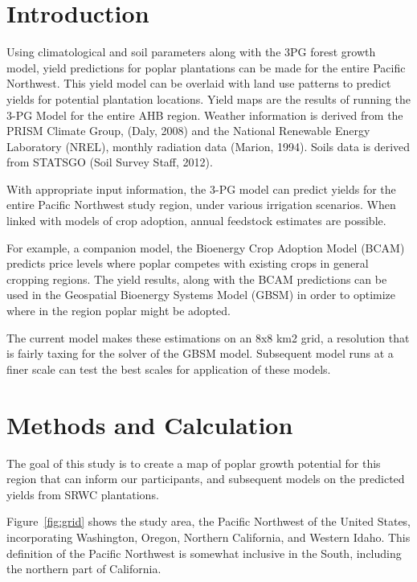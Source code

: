 \documentclass[preprint,12pt]{elsarticle}
\begin{document}

\section{Introduction}
\label{sec:introduction}

Using climatological and soil parameters along with the 3PG forest
growth model, yield predictions for poplar plantations can be made for
the entire Pacific Northwest.  This yield model can be overlaid with
land use patterns to predict yields for potential plantation
locations.  Yield maps are the results of running the 3-PG Model for
the entire AHB region. Weather information is derived from the PRISM
Climate Group, (Daly, 2008) and the National Renewable Energy
Laboratory (NREL), monthly radiation data (Marion, 1994). Soils data
is derived from STATSGO (Soil Survey Staff, 2012).

With appropriate input information, the 3-PG model can predict yields
for the entire Pacific Northwest study region, under various
irrigation scenarios.  When linked with models of crop adoption,
annual feedstock estimates are possible.

For example, a companion model, the Bioenergy Crop Adoption Model
(BCAM) predicts price levels where poplar competes with existing crops
in general cropping regions.  The yield results, along with the BCAM
predictions can be used in the Geospatial Bioenergy Systems Model
(GBSM) in order to optimize where in the region poplar might be
adopted.

The current model makes these estimations on an 8x8 km2 grid, a
resolution that is fairly taxing for the solver of the GBSM model.
Subsequent model runs at a finer scale can test the best scales for
application of these models.

\section{Methods and Calculation}

The goal of this study is to create a map of poplar growth potential
for this region that can inform our participants, and subsequent
models on the predicted yields from \ac{SRWC} plantations.

Figure~\ref{fig:grid} shows the study area, the Pacific Northwest of
the United States, incorporating Washington, Oregon, Northern
California, and Western Idaho.  This definition of the Pacific
Northwest is somewhat inclusive in the South, including the northern
part of California.
\end{document}
